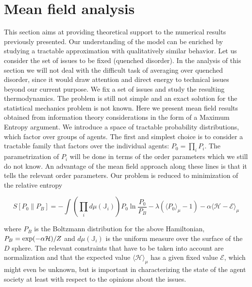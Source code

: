 \documentclass[twocolumn,showpacs]{revtex4-1}
\begin{document}
\section{Mean field analysis}
\label{sec:mft}
This section aims at  providing theoretical support to the numerical results previously presented.
Our understanding of the model can be enriched by studying a tractable approximation 
with qualitatively similar behavior. Let us consider the set of issues to be  fixed 
(quenched disorder). In the analysis of this section we will not deal with the 
difficult task of averaging over quenched disorder, since it would 
draw attention and direct energy to technical issues beyond our current purpose. We
fix a set of issues and study the resulting
thermodynamics. The problem is still not simple and an exact solution
for the statistical mechanics problem is not known.  Here
we present mean field results obtained from information 
theory considerations in the form of a  Maximum Entropy argument.
We introduce a space of  tractable probability distributions,  
which factor over groups of
agents. The first and
 simplest choice is to consider a tractable family that factors
over the individual agents:
$
P_0 = \prod_i P_i
$. The parametrization of $P_i$ will be done in terms of the order
parameters which we still do not know. An advantage
of the mean field approach along these lines is that it tells
the relevant order parameters.
Our problem is reduced to minimization of the relative entropy
\begin{widetext}
\begin{equation}
S\left[P_0 \|P_B \right]=-\int  \left(\prod_i d\mu(\mathbb{J}_i)\right)
P_0
\ln \frac{P_0
}{P_B}
-\lambda (\langle P_0\rangle_\mu-1) - \alpha \langle\mathcal{H-E}\rangle_\mu 
\label{maxent}
\end{equation}
\end{widetext}
where ${P_B}$ is the Boltzmann distribution for the 
above Hamiltonian, $P_B= \exp (-\alpha {\cal H})/Z$ 
and $d\mu(\mathbb{J}_i)$
is the uniform measure over the surface of the $D$ sphere.
The relevant constraints that have to be taken into account
are normalization and that the expected value
 $\langle{\mathcal H}\rangle_\mu$ has a given fixed value $\mathcal{E}$, which might even be 
unknown, but is important in characterizing the state of
the agent society at least with respect to the opinions about the
issues.
\end{document}
